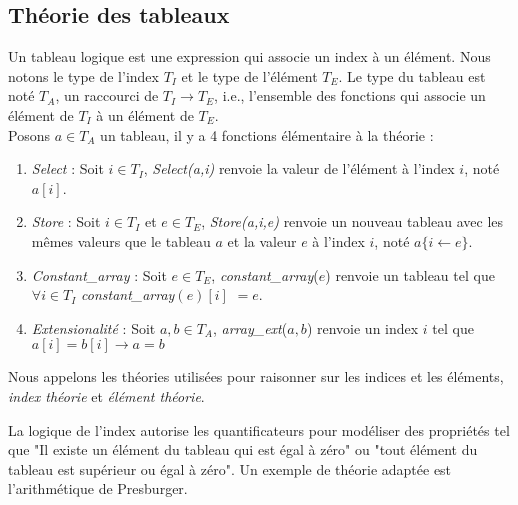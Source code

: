 \documentclass[9pt]{book}
\begin{document}
		
		
		
		
		
	\subsection{Th\'eorie des tableaux}	
	Un tableau logique est une expression qui associe un index \`a un \'el\'ement. Nous notons le type de l'index $T_{I}$ et le type de l'\'el\'ement $T_{E}$. Le type du tableau est not\'e $T_{A}$, un raccourci de $T_{I}\rightarrow T_{E}$, i.e., l'ensemble des fonctions qui associe un \'el\'ement de $T_{I}$ \`a un \'el\'ement de $T_{E}$.\\
	Posons $a\in T_{A}$ un tableau, il y a 4 fonctions \'el\'ementaire \`a la th\'eorie :
	\begin{enumerate}
	\item \textit{Select} : Soit $i\in T_{I}$, \textit{Select(a,i)} renvoie la valeur de l'\'el\'ement \`a l'index $i$, not\'e $a[i]$.
	\item \textit{Store} :  Soit $i\in T_{I}$ et $e\in T_{E}$, \textit{Store(a,i,e)} renvoie un nouveau tableau avec les m\^emes valeurs que le tableau $a$ et la valeur $e$ \`a l'index $i$, not\'e $a\{i\leftarrow e\}$.
	\item \textit{Constant_array} : Soit $e\in T_{E}$, \textit{constant\_array}($e$) renvoie un tableau tel que $\forall i\in T_{I}$  \textit{constant\_array}$(e)[i]$ $= e$.
	\item \textit{Extensionalit\'e} : Soit $a,b\in T_{A}$, \textit{array_ext}($a,b$) renvoie un index $i$ tel que $a[i] = b[i]\rightarrow a = b $
	\end{enumerate}
	Nous appelons les th\'eories utilis\'ees pour raisonner sur les indices et les \'el\'ements, \textit{index th\'eorie} et \textit{\'el\'ement th\'eorie}.\par
La logique de l'index autorise les quantificateurs pour mod\'eliser des propri\'et\'es tel que "Il existe un \'el\'ement du tableau qui est \'egal \`a z\'ero" ou "tout \'el\'ement du tableau est sup\'erieur ou \'egal \`a z\'ero". Un exemple de th\'eorie adapt\'ee est l'arithm\'etique de Presburger.
	
\end{document}
